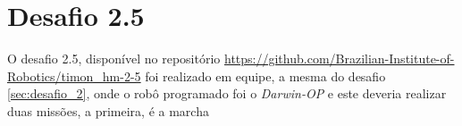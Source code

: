 \section{Desafio 2.5}
\label{sec:desafio_2_5}
O desafio 2.5, disponível no repositório \url{https://github.com/Brazilian-Institute-of-Robotics/timon_hm-2-5} foi realizado em equipe, a mesma do desafio \ref{sec:desafio_2}, onde o robô programado foi o \textit{Darwin-OP} e este deveria realizar duas missões, a primeira, é a marcha  

